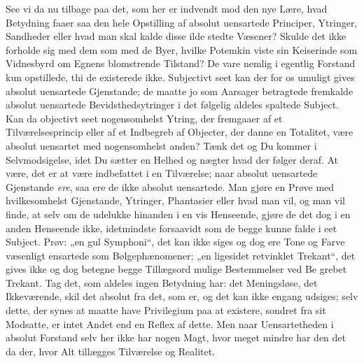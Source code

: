 See vi da nu tilbage paa det, som her er indvendt mod den nye Lære, hvad
Betydning faaer saa den hele Opstilling af absolut uensartede Principer,
Ytringer, Sandheder eller hvad man skal kalde disse ilde stedte
Væsener? Skulde det ikke forholde sig med dem som med de Byer, hvilke
Potemkin viste sin Keiserinde som Vidnesbyrd om Egnens blomstrende Tilstand?
De vare nemlig i egentlig Forstand kun opstillede, thi de existerede ikke.
Subjectivt seet kan der for os umuligt gives absolut uensartede Gjenstande;
de maatte jo som Aarsager betragtede fremkalde absolut uensartede
Bevidsthedsytringer i det følgelig aldeles spaltede Subject. Kan da objectivt
seet nogensomhelst Ytring, der fremgaaer af et Tilværelsesprincip eller af et
Indbegreb af Objecter, der danne en Totalitet, være absolut uensartet med
nogensomhelst anden? Tænk det og Du kommer i Selvmodsigelse, idet Du sætter
en Helhed og nægter hvad der følger deraf. At være, det er at være indbefattet
i en Tilværelse; naar absolut uensartede Gjenstande \emph{ere}, saa ere de
ikke absolut uensartede. Man gjøre en Prøve med hvilkesomhelst Gjenstande,
Ytringer, Phantasier eller hvad man vil, og man vil finde, at selv om de
udelukke hinanden i en vis Henseende, gjøre de det dog i en anden Henseende
ikke, idetmindste forsaavidt som de begge kunne falde i eet Subject. Prøv:
„en gul Symphoni“, det kan ikke siges og dog ere Tone og Farve væsenligt
ensartede som Bølgephænomener; „en ligesidet retvinklet Trekant“, det gives
ikke og dog betegne begge Tillægsord mulige Bestemmelser ved Be%
grebet Trekant. Tag det, som aldeles ingen Betydning har: det Meningsløse, det
Ikkeværende, skil det absolut fra det, som er, og det kan ikke engang
udsiges; selv dette, der synes at maatte have Privilegium paa at existere,
sondret fra sit Modsatte, er intet Andet end en Reflex af dette. Men naar
Uensartetheden i absolut Forstand selv her ikke har nogen Magt, hvor meget
mindre har den det da der, hvor Alt tillægges Tilværelse og Realitet.

